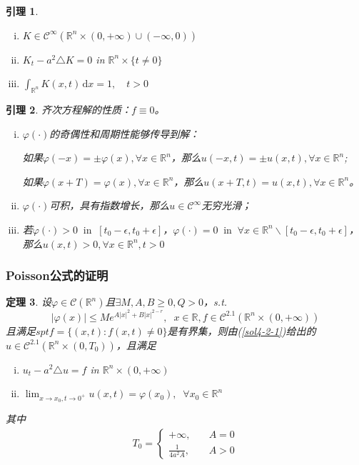 \documentclass[11pt, a4paper]{article}
\theoremstyle{theorem}
\newtheorem{thm}{定理}[section]
\newtheorem{lemma}[thm]{引理}
\newcommand{\intd}[1]{\,\mathrm{d}{#1}}
\begin{document}
\begin{lemma}
\begin{enumerate}[(i)]
    \item $K \in \mathcal{C}^\infty \left( \mathbb{R}^n \times (0, + \infty) \cup (-\infty,0) \right)$
    \item $K_t - a^2 \triangle K = 0$ in $\mathbb{R}^n \times \{t \neq 0\}$
    \item $\int_{\mathbb{R}^n} K(x,t) \intd x = 1, \quad t > 0$
\end{enumerate}
\end{lemma}

\begin{lemma}
齐次方程解的性质：$f \equiv 0$。
\begin{enumerate}[(i)]
  \item $\varphi(\cdot)$的奇偶性和周期性能够传导到解：

  如果$\varphi(-x) = \pm \varphi(x), \forall x \in \mathbb{R}^n$，那么$u(-x,t) = \pm u(x,t), \forall x \in \mathbb{R}^n$;

  如果$\varphi(x + T) = \varphi(x), \forall x \in \mathbb{R}^n$，那么$u(x+T,t) = u(x,t), \forall x \in \mathbb{R}^n$。
  \item $\varphi(\cdot)$可积，具有指数增长，那么$u \in \mathcal{C}^\infty$无穷光滑；
  \item 若$\varphi(\cdot) > 0 \; \; \text{in} \; \; [t_0 - \epsilon, t_0 + \epsilon]$，$\varphi(\cdot) = 0 \; \; \text{in} \; \; \forall x \in \mathbb{R}^n \backslash [t_0 - \epsilon, t_0 + \epsilon]$，那么$u(x,t) > 0, \forall x \in \mathbb{R}^n, t > 0$
\end{enumerate}
\end{lemma}

\subsubsection{Poisson公式的证明}

\begin{thm}
设$\varphi \in \mathcal{C}(\mathbb{R}^n)$且$\exists M, A, B \geq 0, Q > 0$，s.t.
$$
|\varphi(x)| \leq M e^{A|x|^2 + B|x|^{2 - r}}, \; \; x \in \mathbb{R}, f \in \mathcal{C}^{2.1}(\mathbb{R}^n \times (0,+\infty ))
 $$
 且满足$spt f = \{(x,t): f(x,t) \neq 0\}$是有界集，则由(\ref{sol4-2-1})给出的$u \in \mathcal{C}^{2.1} (\mathbb{R}^n \times (0,T_0))$，且满足
 \begin{enumerate}[(i)]
     \item $u_t - a^2 \triangle u = f$ in $\mathbb{R}^n \times (0,+\infty )$
     \item $\lim_{x \rightarrow x_0, t \rightarrow 0^+} u(x,t) = \varphi(x_0), \; \; \forall x_0 \in \mathbb{R}^n$
 \end{enumerate}
 其中
 \begin{align*}
     T_0  = \begin{cases}
     + \infty, \quad &A = 0 \\
     \frac{1}{4a^2A}, \quad &A > 0
     \end{cases}
 \end{align*}
\end{thm}
\end{document}
